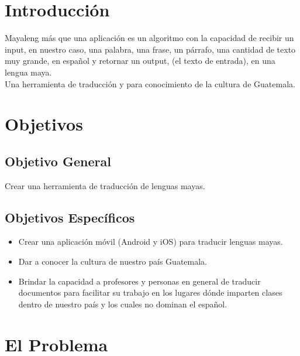 \documentclass[a4paper,openright,12pt]{article}
\begin{document}
\tableofcontents

\cleardoublepage
\listoffigures

\cleardoublepage
\listoftables

\newpage

\pagestyle{fancy}
\section{Introducci\'on}
Mayaleng m\'as que una aplicaci\'on es un algoritmo con la capacidad de recibir un input, en nuestro caso, una palabra, una frase, un p\'arrafo, una cantidad de texto muy grande, en espa\~nol y retornar un output, (el texto de entrada), en una lengua maya. \\

Una herramienta de traducci\'on y para conocimiento de la cultura de Guatemala.
\newpage

\section{Objetivos}
\subsection{Objetivo General}
Crear una herramienta de traducci\'on de lenguas mayas.
\subsection{Objetivos Espec\'ificos}
\begin{itemize}
    \item Crear una aplicaci\'on m\'ovil (Android y iOS) para traducir lenguas mayas.
    \item Dar a conocer la cultura de nuestro pa\'is Guatemala.
    \item Brindar la capacidad a profesores y personas en general de traducir documentos para facilitar su trabajo en los lugares d\'onde imparten clases dentro de nuestro pa\'is y los cuales no dominan el espa\~nol.
\end{itemize}
\newpage

\section{El Problema}
\end{document}
